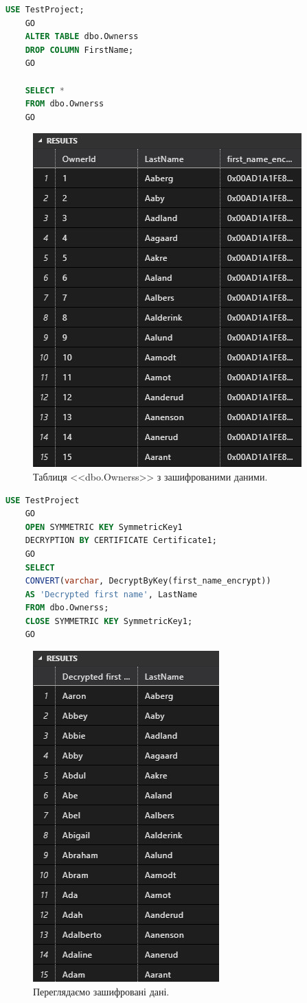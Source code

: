 \documentclass[a4paper,12pt]{article}
\begin{document}
\newpage
	\begin{lstlisting}[language=SQL]
	USE TestProject;
	GO
	ALTER TABLE dbo.Ownerss
	DROP COLUMN FirstName;
	GO
	
	SELECT *
	FROM dbo.Ownerss
	GO
	\end{lstlisting}
	\begin{figure}[h!]
		\begin{minipage}[h]{1\linewidth}
			\centering
			\includegraphics[width=0.5\linewidth]{Prt sc/Figure_1.jpg}  
		\end{minipage}
		\caption{Таблиця <<dbo.Ownerss>> з зашифрованими даними.}
	\end{figure}
	\begin{lstlisting}[language=SQL]
	USE TestProject
	GO
	OPEN SYMMETRIC KEY SymmetricKey1
	DECRYPTION BY CERTIFICATE Certificate1;
	GO
	SELECT 
	CONVERT(varchar, DecryptByKey(first_name_encrypt)) 
	AS 'Decrypted first name', LastName
	FROM dbo.Ownerss;
	CLOSE SYMMETRIC KEY SymmetricKey1;
	GO
	\end{lstlisting}
	\begin{figure}[h!]
		\begin{minipage}[h]{1\linewidth}
			\centering
			\includegraphics[width=0.5\linewidth]{Prt sc/Figure_2.jpg}  
		\end{minipage}
		\caption{Переглядаємо зашифровані дані.}
	\end{figure}
	
\end{document}
